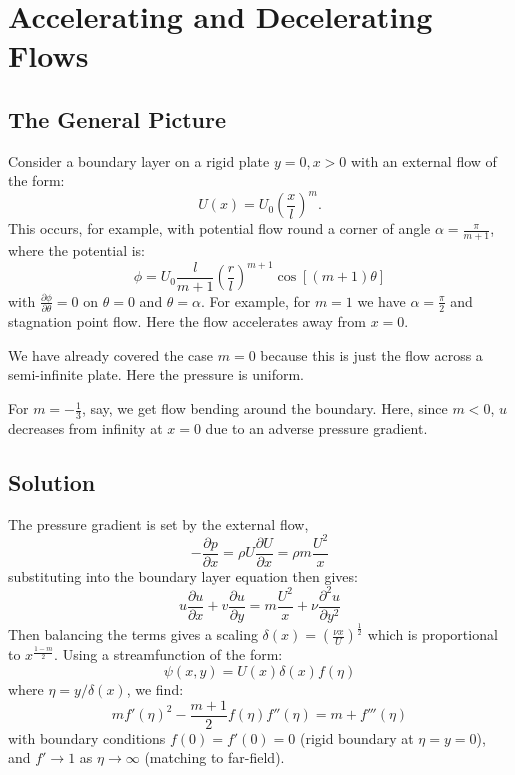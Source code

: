 \documentclass[../Main.tex]{subfiles}
\begin{document}
\section{Accelerating and Decelerating Flows}
\subsection{The General Picture}
Consider a boundary layer on a rigid plate $y = 0, x > 0$ with an external flow of the form:
\begin{equation*}
    U(x) = U_0 \left(\frac x l\right)^m.
\end{equation*}
This occurs, for example, with potential flow round a corner of angle $\alpha = \frac\pi{m+1}$, where the potential is:
\begin{equation*}
    \phi = U_0 \frac{l}{m+1} \left(\frac r l\right)^{m+1} \cos\left[(m+1)\theta\right]
\end{equation*}
with $\frac{\partial \phi}{\partial \theta} = 0$ on $\theta = 0$ and $\theta = \alpha$. For example, for $m = 1$ we have $\alpha = \frac\pi2$ and stagnation point flow. Here the flow accelerates away from $x = 0$.

We have already covered the case $m = 0$ because this is just the flow across a semi-infinite plate. Here the pressure is uniform.

For $m = -\frac13$, say, we get flow bending around the boundary. Here, since $m < 0$, $u$ decreases from infinity at $x = 0$ due to an adverse pressure gradient.
\subsection{Solution}
The pressure gradient is set by the external flow,
\begin{equation*}
    -\frac{\partial p}{\partial x} = \rho U \frac{\partial U}{\partial x} = \rho m \frac{U^2}{x}
\end{equation*}
substituting into the boundary layer equation then gives:
\begin{equation*}
    u \frac{\partial u}{\partial x} + v \frac{\partial u}{\partial y} = m \frac{U^2}{x} + \nu \frac{\partial^{2}u}{\partial y^{2}}
\end{equation*}
Then balancing the terms gives a scaling $\delta(x) = \left(\frac{\nu x}{U}\right)^{\frac12}$ which is proportional to $x^{\frac{1-m}{2}}$. Using a streamfunction of the form:
\begin{equation*}
    \psi(x, y) = U(x) \delta(x) f(\eta)
\end{equation*}
where $\eta = y / \delta(x)$, we find:
\begin{equation*}
    mf'(\eta)^2 - \frac{m+1}{2} f(\eta) f''(\eta) = m + f'''(\eta)
\end{equation*}
with boundary conditions $f(0) = f'(0) = 0$ (rigid boundary at $\eta = y = 0$), and $f' \to 1$ as $\eta \to \infty$ (matching to far-field).
\end{document}
